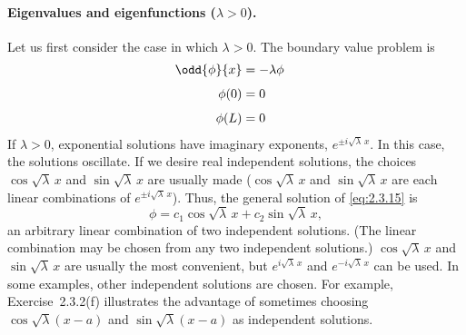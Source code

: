 \paragraph{Eigenvalues and eigenfunctions ($\lambda > 0$).}
Let us first consider the case in which $\lambda > 0$. The boundary value problem is
\begin{alignat}{2}
\odd{\phi}{x} &= -\lambda\phi & \label{eq:2.3.15} \\[4pt]
\phi(0) &= 0 & \label{eq:2.3.16} \\[4pt]
\phi(L) &= 0 & \label{eq:2.3.17}
\end{alignat}
If $\lambda > 0$, exponential solutions have imaginary exponents, $e^{\pm i\sqrt{\lambda}\,x}$. In this case, the solutions oscillate. If we desire real independent solutions, the choices $\cos\sqrt{\lambda}\,x$ and $\sin\sqrt{\lambda}\,x$ are usually made ($\cos\sqrt{\lambda}\,x$ and $\sin\sqrt{\lambda}\,x$ are each linear combinations of $e^{\pm i\sqrt{\lambda}\,x}$). Thus, the general solution of \eqref{eq:2.3.15} is
\begin{equation}
\label{eq:2.3.18}
\phi = c_1\cos\sqrt{\lambda}\,x + c_2\sin\sqrt{\lambda}\,x,
\end{equation}
an arbitrary linear combination of two independent solutions. (The linear combination may be chosen from any two independent solutions.) $\cos\sqrt{\lambda}\,x$ and $\sin\sqrt{\lambda}\,x$ are usually the most convenient, but $e^{i\sqrt{\lambda}\,x}$ and $e^{-i\sqrt{\lambda}\,x}$ can be used. In some examples, other independent solutions are chosen. For example, Exercise~2.3.2(f) illustrates the advantage of sometimes choosing $\cos\sqrt{\lambda}(x-a)$ and $\sin\sqrt{\lambda}(x-a)$ as independent solutions.

